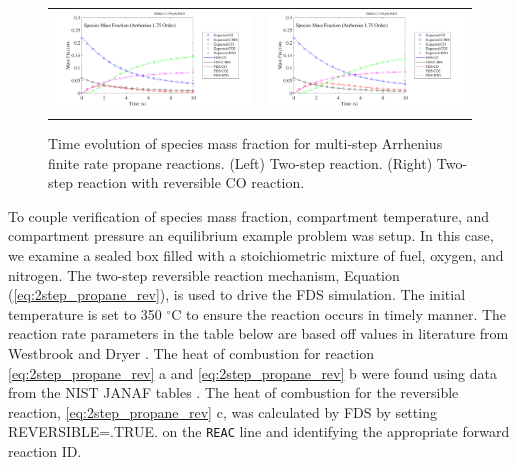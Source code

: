 \documentclass[11pt]{book}
\newcommand{\ct}{\tt\small}
\begin{document}
\begin{figure}[ht]
\begin{tabular*}{\textwidth}{lr}
\includegraphics[width=3.2in]{SCRIPT_FIGURES/ReactionRate_Arrhenius_1p75Order_2Step} &
\includegraphics[width=3.2in]{SCRIPT_FIGURES/ReactionRate_Arrhenius_1p75Order_2StepR}
\end{tabular*}
\caption[Species Evolution in Finite Rate Reaction]{Time evolution of species mass fraction for multi-step Arrhenius finite rate propane reactions. (Left) Two-step reaction. (Right) Two-step reaction with reversible CO reaction.}
\label{fig:Arrhenius_175Order_23step}
\end{figure}
\vskip8pt
To couple verification of species mass fraction, compartment temperature, and compartment pressure an equilibrium example problem was setup. In this case, we examine a sealed box filled with a stoichiometric mixture of fuel, oxygen, and nitrogen. The two-step reversible reaction mechanism, Equation (\ref{eq:2step_propane_rev}), is used to drive the FDS simulation. The initial temperature is set to 350 $^\circ$C to ensure the reaction occurs in timely manner. The reaction rate parameters in the table below are based off values in literature from Westbrook and Dryer \cite{Westbrook:1}. The heat of combustion for reaction \ref{eq:2step_propane_rev} a and \ref{eq:2step_propane_rev} b were found using data from the NIST JANAF tables \cite{NIST_JANAF}. The heat of combustion for the reversible reaction, \ref{eq:2step_propane_rev} c, was calculated by FDS by setting REVERSIBLE=.TRUE. on the {\ct REAC} line and identifying the appropriate forward reaction ID.
\end{document}
